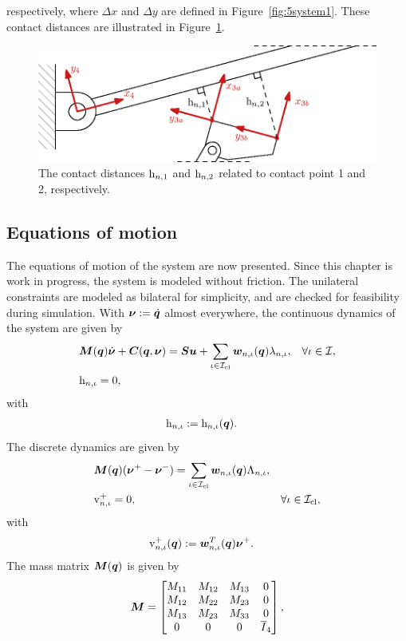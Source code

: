 \documentclass[../DC2019003Bouma.tex]{subfiles}
\begin{document}
respectively, where $\Delta x$ and $\Delta y$ are defined in Figure~\ref{fig:5system1}. These contact distances are illustrated in Figure~\ref{fig:5guards}.
\begin{figure}[bt!]
\centering
\includegraphics[width=.7\textwidth]{guards.eps}\caption{The contact distances $\mathrm{h}_{n,1}$ and $\mathrm{h}_{n,2}$ related to contact point 1 and 2, respectively.}\label{fig:5guards}
\end{figure}

\subsection{Equations of motion}
The equations of motion of the system are now presented. Since this chapter is work in progress, the system is modeled without friction. The unilateral constraints are modeled as bilateral for simplicity, and are checked for feasibility during simulation. With $\boldsymbol{\nu} := \dot{{\boldsymbol{q}}}$ almost everywhere, the continuous dynamics of the system are given by
\begin{align}
&{\boldsymbol{M}}({\boldsymbol{q}})\dot{\boldsymbol{\nu}} + {\boldsymbol{C}}({\boldsymbol{q}},\boldsymbol{\nu}) = {\boldsymbol{S}}{\boldsymbol{u}} + \sum_{\iota\in\mathcal{I}_{\text{cl}}}{\boldsymbol{w}}_{n,\iota}({\boldsymbol{q}})\lambda_{n,\iota}, &\forall \iota\in\mathcal{I}, \label{eq:5ncpcontact1}\\
&\mathrm{h}_{n,\iota} = 0,\label{eq:5ncpcontact2}
\end{align}
with 
\begin{align*}
&\mathrm{h}_{n,\iota} := \mathrm{h}_{n,\iota}({\boldsymbol{q}}).
\end{align*}
The discrete dynamics are given by
\begin{align}
&{\boldsymbol{M}}({\boldsymbol{q}})(\boldsymbol{\nu}^+ - \boldsymbol{\nu}^-) = \sum_{\iota\in\mathcal{I}_{\text{cl}}} {\boldsymbol{w}}_{n,\iota}({\boldsymbol{q}})\Lambda_{n,\iota}, \label{eq:5ncpimpact1}\\
&\mathrm{v}_{n,\iota}^+ = 0, &\forall \iota\in\mathcal{I}_{\text{cl}},\label{eq:5ncpimpact2}
\end{align}
with 
\begin{align*}
\mathrm{v}^+_{n,\iota}({\boldsymbol{q}}) &:= {\boldsymbol{w}}^T_{n,\iota}({\boldsymbol{q}}) \boldsymbol{\nu}^+.
\end{align*}
The mass matrix ${\boldsymbol{M}}({\boldsymbol{q}})$ is given by
\begin{align}
{\boldsymbol{M}} = \begin{bmatrix}
M_{11} & M_{12} & M_{13} & 0\\
M_{12} & M_{22} & M_{23} & 0\\
M_{13} & M_{23} & M_{33} & 0\\
0 & 0 & 0 & \overline{I}_4
\end{bmatrix},
\end{align}
\end{document}

